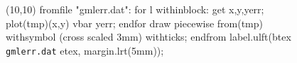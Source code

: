 \documentclass[12pt]{article}
\begin{document}
\begin{gmlfile}
\begin{figure}
\begin{gmlgraph}(10,10)
fromfile "gmlerr.dat":
  for l withinblock: get x,y,yerr; plot(tmp)(x,y) vbar yerr; endfor
  draw piecewise from(tmp) withsymbol (cross scaled 3mm) withticks;
endfrom
label.ulft(btex \texttt{gmlerr.dat} etex, margin.lrt(5mm));
\end{gmlgraph}
\end{figure}
\end{gmlfile}
\end{document}
